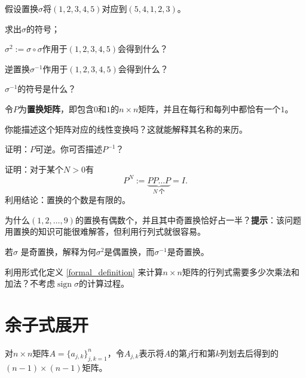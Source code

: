 \begin{problemset}
  \item 假设置换$\sigma$将$(1,2,3,4,5)$对应到$(5,4,1,2,3)$。
  \begin{probenumerate}
    \item 求出$\sigma$的符号；
    \item $\sigma^{2}:=\sigma\circ\sigma$作用于$(1,2,3,4,5)$会得到什么？
    \item 逆置换$\sigma^{-1}$作用于$(1,2,3,4,5)$会得到什么？
    \item $\sigma^{-1}$的符号是什么？
  \end{probenumerate}
  \item 令$P$为\textbf{置换矩阵}，即包含$0$和$1$的$n\times n$矩阵，并且在每行和每列中都恰有一个$1$。
  \begin{probenumerate}
    \item 你能描述这个矩阵对应的线性变换吗？这就能解释其名称的来历。
    \item 证明：$P$可逆。你可否描述$P^{-1}$？
    \item 证明：对于某个$N>0$有\[P^N:=\underbrace{PP\ldots P}_{N~\text{个}}=I.\]
    利用结论：置换的个数是有限的。
  \end{probenumerate}
  \item 为什么$(1,2,\dots,9)$的置换有偶数个，并且其中奇置换恰好占一半？\textbf{提示}：该问题用置换的知识可能很难解答，但利用行列式就很容易。
  \item 若$\sigma$ 是奇置换，解释为何$\sigma^{2}$是偶置换，而$\sigma^{-1}$是奇置换。
  \item 利用形式化定义 \eqref{formal_definition} 来计算$n\times n$矩阵的行列式需要多少次乘法和加法？不考虑$\operatorname{sign}\sigma$的计算过程。
\end{problemset}

\section{余子式展开}

对$n\times n$矩阵$A=\{a_{j,k}\}_{j,k=1}^{n}$，令$A_{j,k}$表示将$A$的第$j$行和第$k$列划去后得到的$(n-1)\times (n-1)$矩阵。

